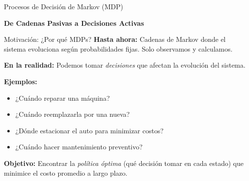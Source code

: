 \documentclass{beamer}
\begin{document}

\begin{frame}{Procesos de Decisión de Markov (MDP)}
    \begin{center}
        \Large{\textbf{De Cadenas Pasivas a Decisiones Activas}}
    \end{center}
\end{frame}

\begin{frame}{Motivación: ¿Por qué MDPs?}
    \small
    \textbf{Hasta ahora:} Cadenas de Markov donde el sistema evoluciona según probabilidades fijas. Solo observamos y calculamos.

    \vspace{0.5em}

    \textbf{En la realidad:} Podemos tomar \textit{decisiones} que afectan la evolución del sistema.

    \vspace{0.5em}

    \textbf{Ejemplos:}
    \begin{itemize}
        \item ¿Cuándo reparar una máquina?
        \item ¿Cuándo reemplazarla por una nueva?
        \item ¿Dónde estacionar el auto para minimizar costos?
        \item ¿Cuándo hacer mantenimiento preventivo?
    \end{itemize}

    \vspace{0.5em}

    \textbf{Objetivo:} Encontrar la \textit{política óptima} (qué decisión tomar en cada estado) que minimice el costo promedio a largo plazo.
\end{frame}
\end{document}
